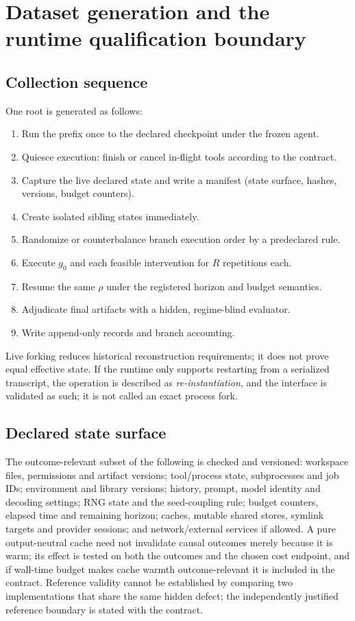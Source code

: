 \section{Dataset generation and the runtime qualification boundary}
\label{sec:b-data}

\subsection{Collection sequence}

One root is generated as follows:
\begin{enumerate}[label=(\arabic*),leftmargin=2em]
\item Run the prefix once to the declared checkpoint under the frozen agent.
\item Quiesce execution: finish or cancel in-flight tools according to the
  contract.
\item Capture the live declared state and write a manifest (state surface,
  hashes, versions, budget counters).
\item Create isolated sibling states immediately.
\item Randomize or counterbalance branch execution order by a predeclared rule.
\item Execute $g_0$ and each feasible intervention for $R$ repetitions each.
\item Resume the same $\rho$ under the registered horizon and budget semantics.
\item Adjudicate final artifacts with a hidden, regime-blind evaluator.
\item Write append-only records and branch accounting.
\end{enumerate}

Live forking reduces historical reconstruction requirements; it does not prove
equal effective state.  If the runtime only supports restarting from a
serialized transcript, the operation is described as \emph{re-instantiation},
and the interface is validated as such; it is not called an exact process fork.

\subsection{Declared state surface}

The outcome-relevant subset of the following is checked and versioned:
workspace files, permissions and artifact versions; tool/process state,
subprocesses and job IDs; environment and library versions; history, prompt,
model identity and decoding settings; RNG state and the seed-coupling rule;
budget counters, elapsed time and remaining horizon; caches, mutable shared
stores, symlink targets and provider sessions; and network/external services if
allowed.  A pure output-neutral cache need not invalidate causal outcomes merely
because it is warm; its effect is tested on both the outcomes and the chosen
cost endpoint, and if wall-time budget makes cache warmth outcome-relevant it is
included in the contract.  Reference validity cannot be established by
comparing two implementations that share the same hidden defect; the
independently justified reference boundary is stated with the contract.

